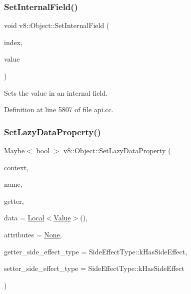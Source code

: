 \subsubsection{\texorpdfstring{Set\+Internal\+Field()}{SetInternalField()}}
{\footnotesize\ttfamily void v8\+::\+Object\+::\+Set\+Internal\+Field (\begin{DoxyParamCaption}\item[{\mbox{\hyperlink{classint}{int}}}]{index,  }\item[{\mbox{\hyperlink{classv8_1_1Local}{v8\+::\+Local}}$<$ \mbox{\hyperlink{classv8_1_1Value}{Value}} $>$}]{value }\end{DoxyParamCaption})}

Sets the value in an internal field. 

Definition at line 5807 of file api.\+cc.

\mbox{\label{classv8_1_1Object_a918a985db244fdc1bde268741e840620}} 
\subsubsection{\texorpdfstring{Set\+Lazy\+Data\+Property()}{SetLazyDataProperty()}}
{\footnotesize\ttfamily \mbox{\hyperlink{classv8_1_1Maybe}{Maybe}}$<$ \mbox{\hyperlink{classbool}{bool}} $>$ v8\+::\+Object\+::\+Set\+Lazy\+Data\+Property (\begin{DoxyParamCaption}\item[{\mbox{\hyperlink{classv8_1_1Local}{Local}}$<$ Context $>$}]{context,  }\item[{\mbox{\hyperlink{classv8_1_1Local}{v8\+::\+Local}}$<$ \mbox{\hyperlink{classv8_1_1Name}{Name}} $>$}]{name,  }\item[{Accessor\+Name\+Getter\+Callback}]{getter,  }\item[{\mbox{\hyperlink{classv8_1_1Local}{v8\+::\+Local}}$<$ \mbox{\hyperlink{classv8_1_1Value}{Value}} $>$}]{data = {\ttfamily \mbox{\hyperlink{classv8_1_1Local}{Local}}$<$\mbox{\hyperlink{classv8_1_1Value}{Value}}$>$()},  }\item[{\mbox{\hyperlink{namespacev8_a05f25f935e108a1ea2d150e274602b87}{Property\+Attribute}}}]{attributes = {\ttfamily \mbox{\hyperlink{namespacev8_a05f25f935e108a1ea2d150e274602b87a7ab4d58719c33b3ea2dfaefa29b111df}{None}}},  }\item[{\mbox{\hyperlink{namespacev8_a29711319c2b9fc7716d65faee2f7b9cb}{Side\+Effect\+Type}}}]{getter\+\_\+side\+\_\+effect\+\_\+type = {\ttfamily SideEffectType\+:\+:kHasSideEffect},  }\item[{\mbox{\hyperlink{namespacev8_a29711319c2b9fc7716d65faee2f7b9cb}{Side\+Effect\+Type}}}]{setter\+\_\+side\+\_\+effect\+\_\+type = {\ttfamily SideEffectType\+:\+:kHasSideEffect} }\end{DoxyParamCaption})}

